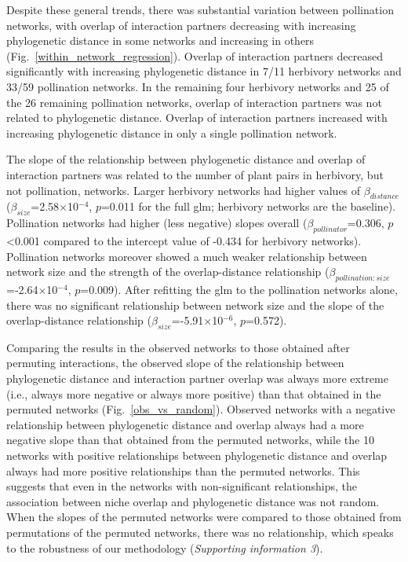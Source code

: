 \documentclass[12pt]{article}
\begin{document}
\begin{spacing}{1.5}
    Despite these general trends, there was substantial variation between 
    pollination networks, with overlap of interaction partners decreasing 
    with increasing phylogenetic distance in some networks and increasing 
    in others (Fig.~\ref{within_network_regression}). Overlap of 
    interaction partners decreased significantly with increasing 
    phylogenetic distance in 7/11 herbivory networks and 33/59 
    pollination networks. In the remaining four herbivory networks and 
    25 of the 26 remaining pollination networks, overlap of interaction 
    partners was not related to phylogenetic distance. Overlap of 
    interaction partners increased with increasing phylogenetic distance 
    in only a single pollination network.%


    The slope of the relationship between phylogenetic distance and 
    overlap of interaction partners was related to the number of plant pairs 
    in herbivory, but not pollination, networks. Larger herbivory networks 
    had higher values of $\beta_{distance}$ 
    ($\beta_{size}$=2.58$\times$10$^{-4}$, $p$=0.011 for the full glm; 
    herbivory networks are the baseline). Pollination networks had 
    higher (less negative) slopes overall ($\beta_{pollinator}$=0.306, 
    $p$\textless0.001 compared to the intercept value of -0.434 for 
    herbivory networks). Pollination networks moreover showed a 
    much weaker relationship between network size and the strength of the 
    overlap-distance relationship 
    ($\beta_{pollination:size}$=-2.64$\times$10$^{-4}$, $p$=0.009). 
    After refitting the glm to the pollination networks alone, there was 
    no significant relationship between network size and the slope of 
    the overlap-distance relationship ($\beta_{size}$=-5.91$\times$10$^{-6}$, 
    $p$=0.572).


    Comparing the results in the observed networks to those obtained after 
    permuting interactions, the observed 
    slope of the relationship between phylogenetic distance and interaction 
    partner overlap was always more extreme (i.e., always more negative or 
    always more positive) than that obtained in the permuted networks (Fig.~\ref{obs_vs_random}).
    Observed networks with a negative relationship between phylogenetic distance 
    and overlap always had a more negative slope than that obtained from the 
    permuted networks, while the 10 networks with positive relationships 
    between phylogenetic distance and overlap always had more positive 
    relationships than the permuted networks. This suggests that even in 
    the networks with non-significant relationships, the association between niche overlap and 
    phylogenetic distance was not random. When the slopes of the permuted 
    networks were compared to those obtained from permutations of the 
    permuted networks, there was no relationship, which speaks to the robustness of our methodology (\emph{Supporting information 3}). 



\end{spacing}
\end{document}
